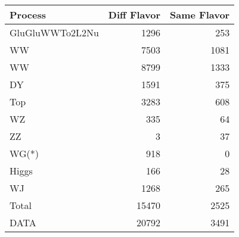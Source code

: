 \begin{table}[ht]
	\centering
\begin{tabular}{lrr}

         Process &  Diff Flavor &  Same Flavor \\
		\hline
 GluGluWWTo2L2Nu &         1296 &          253 \\
              WW &         7503 &         1081 \\
              WW &         8799 &         1333 \\
              DY &         1591 &          375 \\
             Top &         3283 &          608 \\
              WZ &          335 &           64 \\
              ZZ &            3 &           37 \\
           WG(*) &          918 &            0 \\
           Higgs &          166 &           28 \\
              WJ &         1268 &          265 \\
\hline
           Total &        15470 &         2525 \\
            DATA &        20792 &         3491 \\


\end{tabular}

\end{table}